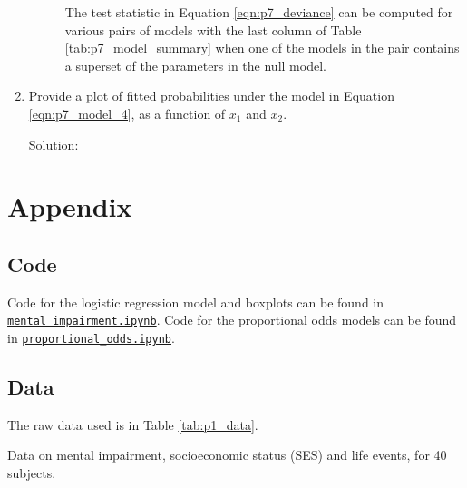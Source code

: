 \documentclass[letterpaper,11pt]{article}
\begin{document}
\begin{enumerate}
\begin{description}
    The test statistic in Equation \ref{eqn:p7_deviance} can be computed for
    various pairs of models with the last column of Table
    \ref{tab:p7_model_summary} when one of the models in the pair contains a
    superset of the parameters in the null model.
    
  \end{description}
\item Provide a plot of fitted probabilities under the model in Equation
  \ref{eqn:p7_model_4}, as a function of $x_1$ and $x_2$.
  
  \begin{description}
  \item[Solution:] 
  \end{description}
\end{enumerate}
\section*{Appendix}

\subsection*{Code}

Code for the logistic regression model and boxplots can be found in
\href{http://nbviewer.jupyter.org/github/ppham27/stat570/blob/master/hw7/mental_impairment.ipynb}{\texttt{mental\_impairment.ipynb}}. Code
for the proportional odds models can be found in
\href{http://nbviewer.jupyter.org/github/ppham27/stat570/blob/master/hw7/proportional\_odds.ipynb}{\texttt{proportional\_odds.ipynb}}.

\subsection*{Data}

The raw data used is in Table \ref{tab:p1_data}.

\begin{table}
  \small
  \centering
  
  \caption{Data on mental impairment, socioeconomic status (SES) and life
    events, for 40 subjects.}
  \label{tab:p1_data}
\end{table}
\end{document}
